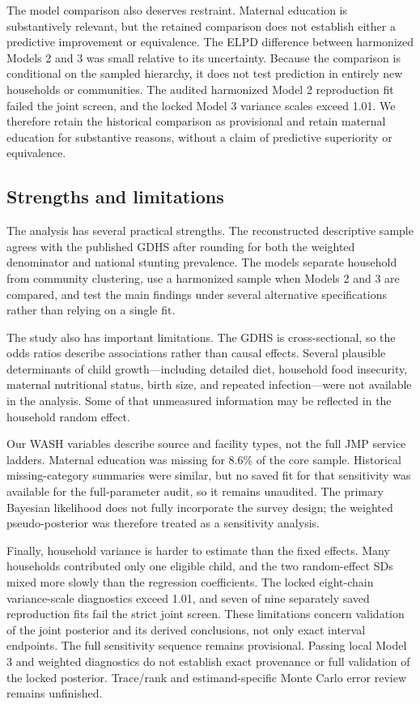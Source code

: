 \documentclass[11pt]{article}
\begin{document}
The model comparison also deserves restraint. Maternal education is substantively relevant, but the retained comparison does not establish either a predictive improvement or equivalence. The ELPD difference between harmonized Models 2 and 3 was small relative to its uncertainty. Because the comparison is conditional on the sampled hierarchy, it does not test prediction in entirely new households or communities. The audited harmonized Model 2 reproduction fit failed the joint screen, and the locked Model 3 variance scales exceed 1.01. We therefore retain the historical comparison as provisional and retain maternal education for substantive reasons, without a claim of predictive superiority or equivalence.

\subsection{Strengths and limitations}

The analysis has several practical strengths. The reconstructed descriptive sample agrees with the published GDHS after rounding for both the weighted denominator and national stunting prevalence. The models separate household from community clustering, use a harmonized sample when Models 2 and 3 are compared, and test the main findings under several alternative specifications rather than relying on a single fit.

The study also has important limitations. The GDHS is cross-sectional, so the odds ratios describe associations rather than causal effects. Several plausible determinants of child growth---including detailed diet, household food insecurity, maternal nutritional status, birth size, and repeated infection---were not available in the analysis. Some of that unmeasured information may be reflected in the household random effect.

Our WASH variables describe source and facility types, not the full JMP service ladders. Maternal education was missing for 8.6\% of the core sample. Historical missing-category summaries were similar, but no saved fit for that sensitivity was available for the full-parameter audit, so it remains unaudited. The primary Bayesian likelihood does not fully incorporate the survey design; the weighted pseudo-posterior was therefore treated as a sensitivity analysis.

Finally, household variance is harder to estimate than the fixed effects. Many households contributed only one eligible child, and the two random-effect SDs mixed more slowly than the regression coefficients. The locked eight-chain variance-scale diagnostics exceed 1.01, and seven of nine separately saved reproduction fits fail the strict joint screen. These limitations concern validation of the joint posterior and its derived conclusions, not only exact interval endpoints. The full sensitivity sequence remains provisional. Passing local Model 3 and weighted diagnostics do not establish exact provenance or full validation of the locked posterior. Trace/rank and estimand-specific Monte Carlo error review remains unfinished.
\end{document}
